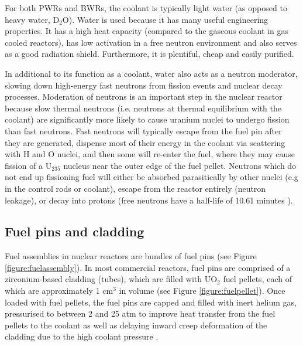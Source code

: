 For both PWRs and BWRs, the coolant is typically light water (as opposed to heavy water, D$_{2}$O). Water is used because it has many useful engineering properties. It has a high heat capacity (compared to the gaseous coolant in gas cooled reactors), has low activation in a free neutron environment and also serves as a good radiation shield. Furthermore, it is plentiful, cheap and easily purified.

In additional to its function as a coolant, water also acts as a neutron moderator, slowing down high-energy fast neutrons from fission events and nuclear decay processes. Moderation of neutrons is an important step in the nuclear reactor because slow thermal neutrons (i.e. neutrons at thermal equilibrium with the coolant) are significantly more likely to cause uranium nuclei to undergo fission than fast neutrons. Fast neutrons will typically escape from the fuel pin after they are generated, dispense most of their energy in the coolant via scattering with H and O nuclei, and then some will re-enter the fuel, where they may cause fission of a U$_{235}$ nucleus near the outer edge of the fuel pellet. Neutrons which do not end up fissioning fuel will either be absorbed parasitically by other nuclei (e.g in the control rods or coolant), escape from the reactor entirely (neutron leakage), or decay into protons (free neutrons have a half-life of 10.61 minutes \cite{Christensen1972}).

\subsection{Fuel pins and cladding} \label{ss_fuelpin}

Fuel assemblies in nuclear reactors are bundles of fuel pins (see Figure \ref{figure:fuelassembly}). In most commercial reactors, fuel pins are comprised of a zirconium-based cladding (tubes), which are filled with UO$_{2}$ fuel pellets, each of which are approximately 1 cm$^{3}$ in volume (see Figure \ref{figure:fuelpellet}). Once loaded with fuel pellets, the fuel pins are capped and filled with inert helium gas, pressurised to between 2 and 25 atm to improve heat transfer from the fuel pellets to the coolant as well as delaying inward creep deformation of the cladding due to the high coolant pressure \cite{King1980}. 

